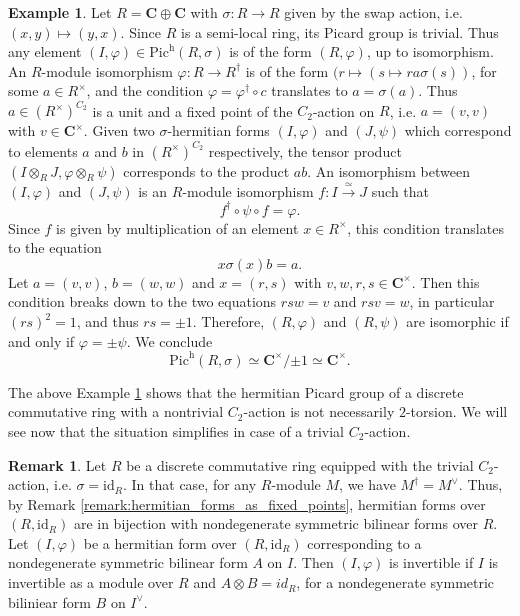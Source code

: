 \documentclass{article}
\theoremstyle{definition}
\newtheorem{remark}[equation]{Remark}
\newtheorem{example}[equation]{Example}
\begin{document}
\begin{example}
    \label{example:hermetian_picard_group_is_not_2-torsion-swap_action_on_fields}
    Let $R=\mathbf{C}\oplus \mathbf{C}$ with $\sigma:R\rightarrow R$ given by the swap action, i.e. $(x,y)\mapsto (y,x)$. Since $R$ is a semi-local ring, its Picard group is trivial. Thus any element $(I,\varphi)\in \text{Pic}^\text{h}(R,\sigma)$ is of the form $(R,\varphi)$, up to isomorphism. An $R$-module isomorphism $\varphi:R\rightarrow R^\dagger$ is of the form $(r\mapsto (s\mapsto ra\sigma(s))$, for some $a\in R^\times$, and the condition $\varphi=\varphi^\dagger \circ c$ translates to $a=\sigma(a)$. Thus $a\in (R^\times)^{C_2}$ is a unit and a fixed point of the $C_2$-action on $R$, i.e. $a=(v,v)$ with $v\in \mathbf{C}^\times$. Given two $\sigma$-hermitian forms $(I,\varphi)$ and $(J,\psi)$ which correspond to elements $a$ and $b$ in $(R^\times)^{C_2}$ respectively, the tensor product $(I\otimes_R J,\varphi\otimes_R \psi)$ corresponds to the product $ab$. An isomorphism between  $(I,\varphi)$ and $(J,\psi)$ is an $R$-module isomorphism $f:I\xrightarrow{\simeq} J$ such that $$f^\dagger\circ\psi\circ f=\varphi.$$ Since $f$ is given by multiplication of an element $x\in R^\times$, this condition translates to the equation $$x\sigma(x)b=a.$$ Let $a=(v,v)$, $b=(w,w)$ and $x=(r,s)$ with $v,w,r,s\in \mathbf{C}^\times$. Then this condition breaks down to the two equations $rsw=v$ and $rsv=w$, in particular $(rs)^2=1$, and thus $rs=\pm 1$. Therefore, $(R,\varphi)$ and $(R,\psi)$ are isomorphic if and only if $\varphi=\pm\psi$. We conclude $$\text{Pic}^\text{h}(R,\sigma)\simeq \mathbf{C}^\times/{\pm 1}\simeq \mathbf{C}^\times.$$
\end{example}

The above Example \ref{example:hermetian_picard_group_is_not_2-torsion-swap_action_on_fields} shows that the hermitian Picard group of a discrete commutative ring with a nontrivial $C_2$-action is not necessarily $2$-torsion. We will see now that the situation simplifies in case of a trivial $C_2$-action.

\begin{remark}
    \label{remark:id-hermetian_forms_are_symmetric_billinear_forms}
    Let $R$ be a discrete commutative ring equipped with the trivial $C_2$-action, i.e. $\sigma=\text{id}_R$. In that case, for any $R$-module $M$, we have $M^\dagger=M^\vee$. Thus, by Remark \ref{remark:hermitian_forms_as_fixed_points}, hermitian forms over $(R,\text{id}_R)$ are in bijection with nondegenerate symmetric bilinear forms over $R$. Let $(I,\varphi)$ be a hermitian form over $(R,\text{id}_R)$ corresponding to a nondegenerate symmetric bilinear form $A$ on $I$. Then $(I,\varphi)$ is invertible if $I$ is invertible as a module over $R$ and $A\otimes B=id_R$, for a nondegenerate symmetric biliniear form $B$ on $I^\vee$.
\end{remark}
\end{document}

